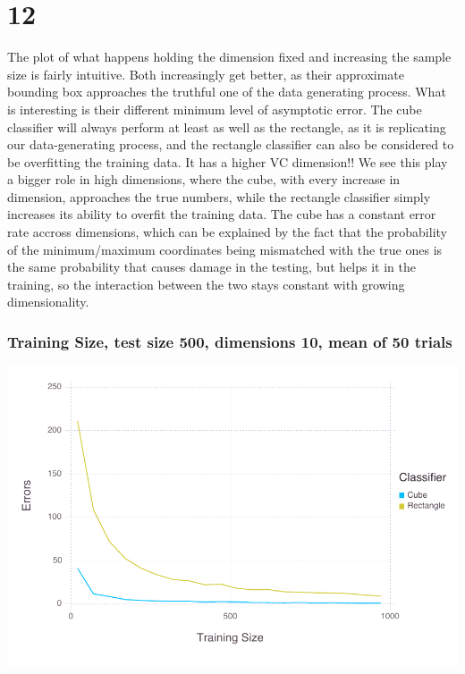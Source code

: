 \documentclass[a4paper,12pt]{article}
\begin{document}
\section*{12}
The plot of what happens holding the dimension fixed and increasing the sample size is fairly intuitive. Both increasingly get better, as their approximate bounding box approaches the truthful one of the data generating process. What is interesting is their different minimum level of asymptotic error. The cube classifier will always perform at least as well as the rectangle, as it is replicating our data-generating process, and the rectangle classifier can also be considered to be overfitting the training data. It has a higher VC dimension!! We see this play a bigger role in high dimensions, where the cube, with every increase in dimension, approaches the true numbers, while the rectangle classifier simply increases its ability to overfit the training data. The cube has a constant error rate accross dimensions, which can be explained by the fact that the probability of the minimum/maximum coordinates being mismatched with the true ones is the same probability that causes damage in the testing, but helps it in the training, so the interaction between the two stays constant with growing dimensionality.




\subsubsection*{Training Size, test size 500, dimensions 10, mean of 50 trials}
\includegraphics[width=\linewidth]{figures/problemset3_2_1.pdf}
\end{document}
